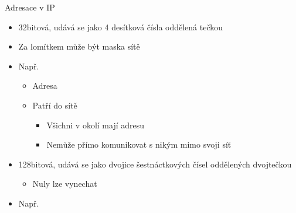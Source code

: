 \begin{frame}{Adresace v IP}

  \begin{itemize}
    \item 32bitová, udává se jako 4 desítková čísla oddělená tečkou
    \item Za lomítkem může být maska sítě

    \pause

    \item Např.\ 
    \begin{itemize}
      \item Adresa 
      \item Patří do sítě 
      \begin{itemize}
	\item Všichni v okolí mají adresu 
	\item Nemůže přímo komunikovat s nikým mimo svoji síť
      \end{itemize}
    \end{itemize}
  \end{itemize}

  \begin{itemize}
    \item 128bitová, udává se jako dvojice šestnáctkových čísel
      oddělených dvojtečkou
    \begin{itemize}
      \item Nuly lze vynechat
    \end{itemize}

    \pause

    \item Např.\ 
  \end{itemize}

  \pause

  \begin{center}
   \\
  \pause
  \end{center}

\end{frame}

